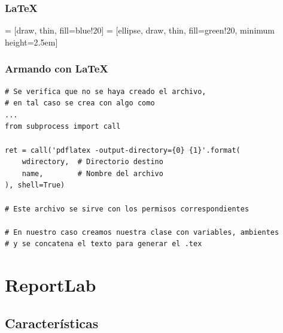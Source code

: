 \documentclass[8pt,xcolor={usenames,dvipsnames}]{beamer}
\begin{document}
\begin{frame}
\frametitle{\LaTeX}

 = [draw, thin, fill=blue!20]
 = [ellipse, draw, thin, fill=green!20, minimum height=2.5em]

\begin{figure}
\end{figure}
\end{frame}

\begin{frame}[fragile]
\frametitle{Armando con \LaTeX}
\begin{verbatim}
# Se verifica que no se haya creado el archivo,
# en tal caso se crea con algo como
...
from subprocess import call

ret = call('pdflatex -output-directory={0} {1}'.format(
    wdirectory,  # Directorio destino
    name,        # Nombre del archivo
), shell=True)

# Este archivo se sirve con los permisos correspondientes

# En nuestro caso creamos nuestra clase con variables, ambientes
# y se concatena el texto para generar el .tex

\end{verbatim}
\end{frame}


\section{ReportLab}

\subsection{Características}
\end{document}
